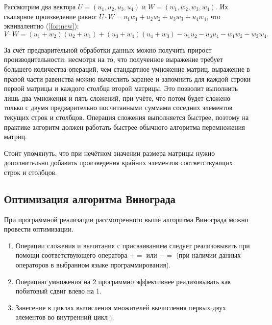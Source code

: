 Рассмотрим два вектора $U = (u_1, u_2, u_3, u_4)$ и $W = (w_1, w_2, w_3, w_4)$.
Их скалярное произведение равно: $U \cdot W = u_1w_1 + u_2w_2 + u_3w_3 + u_4w_4$, что эквивалентно (\ref{for:new}):
\newpage
\begin{equation}
	\label{for:new}
	V \cdot W = (u_1 + w_2)(u_2 + w_1) + (u_3 + w_4)(u_4 + w_3) - u_1u_2 - u_3u_4 - w_1w_2 - w_3w_4.
\end{equation}

За счёт предварительной обработки данных можно получить прирост производительности: несмотря на то, что  полученное выражение требует большего количества операций, чем стандартное умножение матриц, выражение в правой части равенства можно вычислить заранее и запомнить для каждой строки первой матрицы и каждого столбца второй матрицы. 
Это позволит выполнить лишь два умножения и пять сложений, при учёте, что потом будет сложено только с двумя предварительно посчитанными суммами соседних элементов текущих строк и столбцов. 
Операция сложения выполняется быстрее, поэтому на практике алгоритм должен работать быстрее обычного алгоритма перемножения матриц.

Стоит упомянуть, что при нечётном значении размера матрицы нужно дополнительно добавить произведения крайних элементов соответствующих строк и столбцов.

\subsection{Оптимизация алгоритма Винограда}

При программной реализации рассмотренного выше алгоритма Винограда можно провести оптимизации.
\begin{enumerate}
	\item Операции сложения и вычитания с присваиванием следует реализовывать при помощи соответствующего оператора $+=$ или $-=$ (при наличии данных операторов в выбранном языке программирования).
	\item Операцию умножения на 2 программно эффективнее реализовывать как побитовый сдвиг влево на 1.
	\item Занесение в циклах вычисления множителей вычисления первых двух
	элементов во внутренний цикл j.
\end{enumerate}